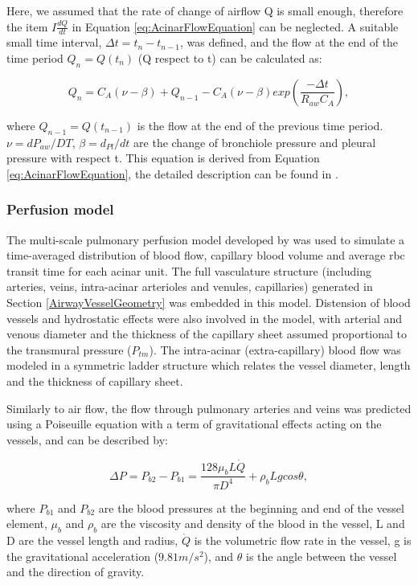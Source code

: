 Here, we assumed that the rate of change of airflow Q is small enough, therefore the item $I\frac{dQ}{dt}$ in Equation \ref{eq:AcinarFlowEquation} can be neglected. A suitable small time interval, $\Delta t = t_n - t_{n-1}$, was defined, and the flow at the end of the time period $Q_n = Q(t_n)$ (Q respect to t) can be calculated as:

\begin{equation}
 \label{eq:FlowRespectToTime}
 Q_n = C_A(\nu - \beta) + Q_{n-1} - C_A(\nu - \beta)exp(\frac{-\Delta t}{R_{aw}C_A}),
\end{equation}

\noindent where $Q_{n-1} = Q(t_{n-1})$ is the flow at the end of the previous time period. $\nu = dP_{aw}/DT$, $\beta = d_{Pl}/dt$ are the change of bronchiole pressure and pleural pressure with respect t. This equation is derived from Equation \ref{eq:AcinarFlowEquation}, the detailed description can be found in \cite{swan2012computational}.

\subsubsection{Perfusion model}
The multi-scale pulmonary perfusion model developed by \cite{clark2011interdependent} was used to simulate a time-averaged distribution of blood flow, capillary blood volume and average \gls{rbc} transit time for each acinar unit. The full vasculature structure (including arteries, veins, intra-acinar arterioles and venules, capillaries) generated in Section \ref{AirwayVesselGeometry} was embedded in this model. Distension of blood vessels and hydrostatic effects were also involved in the model, with arterial and venous diameter and the thickness of the capillary sheet assumed proportional to the transmural pressure ($P_{tm}$). The intra-acinar (extra-capillary) blood flow was modeled in a symmetric ladder structure which relates the vessel diameter, length and the thickness of capillary sheet.

Similarly to air flow, the flow through pulmonary arteries and veins was predicted using a Poiseuille equation  with a term of gravitational effects acting on the vessels, and can be described by:

\begin{equation}
 \label{eq:VesselFlow}
 \Delta P = P_{b2} - P_{b1} = \frac{128 \mu_bL\dot{Q}}{\pi D^{4}} + \rho_b Lgcos\theta,
\end{equation}

\noindent where $P_{b1}$ and $P_{b2}$ are the blood pressures at the beginning and end of the vessel element, $\mu_b$ and $\rho_b$ are the viscosity and density of the blood in the vessel, L and D are the vessel length and radius, $\dot{Q}$ is the volumetric flow rate in the vessel, g is the gravitational acceleration ($9.81m/s^2$), and $\theta$ is the angle between the vessel and the direction of gravity. 

